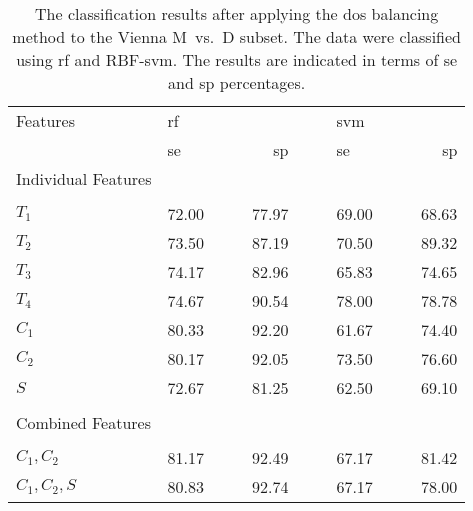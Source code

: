 \begin{table}[t]
	\caption[Results of Experiment~\#2 - \ac{dos}-balance-training case]{The classification results after applying the \ac{dos} balancing method to the Vienna M~vs.~D subset.
	The data were classified using \ac{rf} and RBF-\ac{svm}.
	The results are indicated in terms of \acf{se} and \acf{sp} percentages.}
	\label{tab:globalmapExp2}
	\medskip
		
	\footnotesize{
	\begin{center}
	\begin{tabularx}{0.73\textwidth}{@{}l	lllr	 ll	lllr	 @{}}
	\toprule
	Features & \multicolumn{4}{l}{\ac{rf}} & & & \multicolumn{4}{l}{\ac{svm}} \\
	\cmidrule{2-5} \cmidrule{8-11} 
	& \ac{se} & & & \ac{sp} & & &  \ac{se} & & & \ac{sp} \\
	\cmidrule{2-11}
	Individual Features\\
	\multicolumn{11}{l}{}\\[-1ex]
 $T_1$ & 72.00	& & & 77.97 & & &  69.00 & & & 68.63\\
 $T_2$ & 73.50	& & & 87.19 & & &  70.50	 & & & 89.32\\
 $T_3$ & \cellcolor[gray]{0.8}74.17	&\cellcolor[gray]{0.8} &\cellcolor[gray]{0.8} & \cellcolor[gray]{0.8}82.96	& & &  65.83	 & & & 74.65\\
 $T_4$ & \cellcolor[gray]{0.8}74.67	&\cellcolor[gray]{0.8} &\cellcolor[gray]{0.8} & \cellcolor[gray]{0.8}90.54    & & &  \cellcolor[gray]{0.8}78.00 &\cellcolor[gray]{0.8} &\cellcolor[gray]{0.8} & \cellcolor[gray]{0.8}78.78\\
 $C_1$ & \cellcolor[gray]{0.8}80.33	&\cellcolor[gray]{0.8} &\cellcolor[gray]{0.8} & \cellcolor[gray]{0.8}92.20	& & &  61.67	 & & & 74.40\\
 $C_2$ & \cellcolor[gray]{0.8}80.17	&\cellcolor[gray]{0.8} &\cellcolor[gray]{0.8} & \cellcolor[gray]{0.8}92.05	& & &  73.50	 & & & 76.60\\
  $S$  & 72.67	& & & 81.25	& & &  62.50	 & & & 69.10\\	
	\multicolumn{11}{l}{}\\
	Combined Features\\
	\multicolumn{11}{l}{}\\[-1ex]
$C_1,C_2	$					& \cellcolor[gray]{0.8}81.17 &\cellcolor[gray]{0.8} &\cellcolor[gray]{0.8} & \cellcolor[gray]{0.8}92.49 & & & 67.17 & & & 81.42\\
$C_1,C_2,S$					& 80.83	& & & 92.74	& & & 67.17 & & & 78.00\\

\end{tabularx}
\end{center}}
\end{table}
